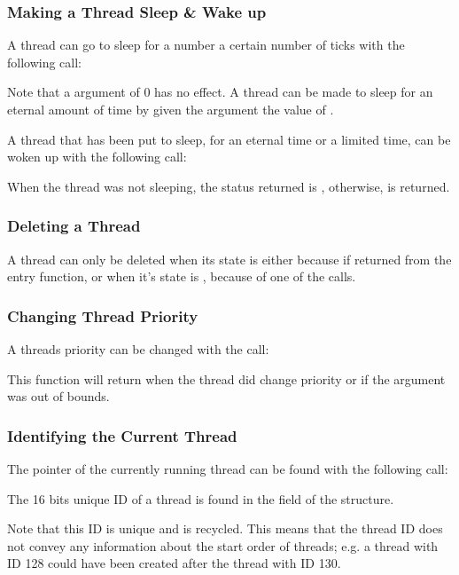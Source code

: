 \subsubsection{Making a Thread Sleep \& Wake up}

A thread can go to sleep for a number a certain number of ticks with the
following call:


Note that a  argument of 0 has no effect. A thread can be made
to sleep for an eternal amount of time by given the  argument
the value of . 

A thread that has been put to sleep, for an eternal time or a limited time,
can be woken up with the following call:


When the thread was not sleeping, the status returned is
, otherwise,  is returned.

\subsubsection{Deleting a Thread}

A thread can only be deleted when its state is either 
because if returned from the entry function, or when it's state is
, because of one of the 
calls.

\subsubsection{Changing Thread Priority}

A threads priority can be changed with the call:


This function will return  when the thread did change
priority or  if the  argument was
out of bounds.

\subsubsection{Identifying the Current Thread}

The  pointer of the currently running thread can be
found with the following call:


The 16 bits unique ID of a thread is found in the
 field of the  structure.

Note that this ID is unique and is recycled. This means that the thread ID
does not convey any information about the start order of threads; e.g. a
thread with ID 128 could have been created after the thread with ID 130.





